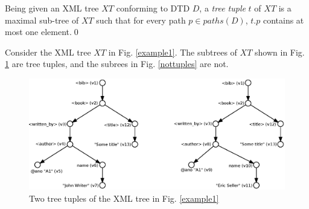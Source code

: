 \begin{define}\label{treeTuple}
Being given an XML tree $XT$ conforming to DTD $D$, a {\sl tree tuple} $t$ of $XT$ is a maximal sub-tree of $XT$ such that for every path $p \in paths(D)$, $t.p$ contains at most one element.\qed
\end{define}

\begin{example}
Consider the XML tree $XT$ in Fig. \ref{example1}. The subtrees of $XT$ shown in Fig. \ref{tuples} are tree tuples, and the subrees in Fig. \ref{nottuples} are not.

\begin{figure}[H]
    \centering\includegraphics[width=\textwidth]{tuples}
	\caption{Two tree tuples of the XML tree in Fig. \ref{example1}} \label{tuples}
\end{figure}


\end{example}
